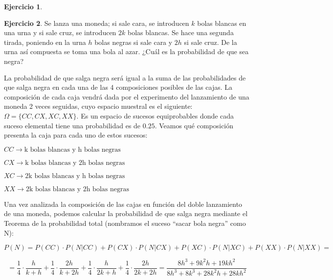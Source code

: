 \documentclass[a4paper, 12pt]{article}
\theoremstyle{definition}
\newtheorem{ej}{Ejercicio}
\begin{document}
\begin{ej}
\end{ej}

\begin{ej}
Se lanza una moneda; si sale cara, se introducen $k$ bolas blancas en una urna y si sale cruz, se
introducen $2k$ bolas blancas. Se hace una segunda tirada, poniendo en la urna $h$ bolas negras
si sale cara y $2h$ si sale cruz. De la urna así compuesta se toma una bola al azar. ¿Cuál es la
probabilidad de que sea negra?


\medskip

La probabilidad de que salga negra será igual a la suma de las probabilidades de que salga negra en cada una de las 4 composiciones posibles de las cajas. La composición de cada caja vendrá dada por el experimento del lanzamiento de una moneda 2 veces seguidas, cuyo espacio muestral es el siguiente: $\Omega = \{CC,CX,XC,XX\}$. Es un espacio de sucesos equiprobables donde cada suceso elemental tiene una probabilidad es de $0.25$. Veamos qué composición presenta la caja para cada uno de estos sucesos:

\begin{center}
    $CC \longrightarrow \text{k bolas blancas y h bolas negras}$
    
    $CX \longrightarrow \text{k bolas blancas y 2h bolas negras}$
    
    $XC \longrightarrow \text{2k bolas blancas y h bolas negras}$
    
    $XX \longrightarrow \text{2k bolas blancas y 2h bolas negras}$
\end{center}

Una vez analizada la composición de las cajas en función del doble lanzamiento de una moneda, podemos calcular la probabilidad de que salga negra mediante el Teorema de la probabilidad total (nombramos el suceso ``sacar bola negra'' como N):

\begin{center}
    $P(N) = P(CC) \cdot P(N|CC) + P(CX) \cdot P(N|CX) + P(XC) \cdot P(N|XC) + P(XX) \cdot P(N|XX) = $
\end{center}

\[
    = \frac{1}{4} \cdot \frac{h}{k+h} + \frac{1}{4} \cdot \frac{2h}{k+2h} + \frac{1}{4} \cdot \frac{h}{2k+h} + \frac{1}{4} \cdot \frac{2h}{2k+2h} = \frac{8h^3+9k^{2}h+19kh^2}{8h^3+8k^3+28k^{2}h+28kh^2}
\]
\end{ej}
\end{document}

